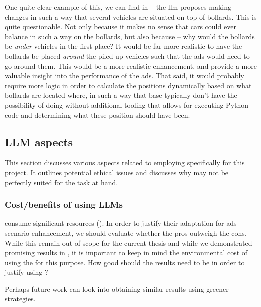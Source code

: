 One quite clear example of this, we can find in
 -- the \acrshort{llm} proposes making changes
in such a way that several vehicles are situated on top of bollards. This is
quite questionable. Not only because it makes no sense that cars could ever
balance in such a way on the bollards, but also because -- why would the
bollards be \emph{under} vehicles in the first place? It would be far more
realistic to have the bollards be placed \emph{around} the piled-up vehicles
such that the \acrshort{ads} would need to go around them. This would be a more
realistic enhancement, and provide a more valuable insight into the performance
of the \acrshort{ads}. That said, it would probably require more logic in order
to calculate the positions dynamically based on what bollards are located where,
in such a way that base  typically don't have the possibility of
doing without additional tooling that allows for executing Python code and
determining what these position should have been.

\subsection{LLM aspects}\label{sec:discussionLlmAspects}

This section discusses various aspects related to employing specifically
 for this project. It outlines potential ethical issues and
discusses why  may not be perfectly suited for the task at hand.

\subsubsection{Cost/benefits of using LLMs}

 consume significant resources (). In order to justify their
adaptation for \acrshort{ads} scenario enhancement, we should evaluate whether the pros outweigh the
cons. While this remain out of scope for the current thesis and while we demonstrated promising
results in , it is important to keep in mind the environmental cost of using the
 for this purpose. How good should the results need to be in order to justify using
?

Perhaps future work can look into obtaining similar results using greener strategies.


